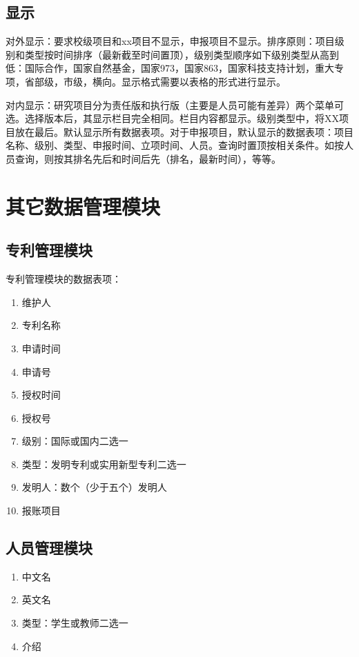 \subsection{显示}

对外显示：要求校级项目和xx项目不显示，申报项目不显示。排序原则：项目级别和类型按时间排序（最新截至时间置顶），级别类型顺序如下级别类型从高到低：国际合作，国家自然基金，国家973，国家863，国家科技支持计划，重大专项，省部级，市级，横向。显示格式需要以表格的形式进行显示。

对内显示：研究项目分为责任版和执行版（主要是人员可能有差异）两个菜单可选。选择版本后，其显示栏目完全相同。栏目内容都显示。级别类型中，将XX项目放在最后。默认显示所有数据表项。对于申报项目，默认显示的数据表项：项目名称、级别、类型、申报时间、立项时间、人员。查询时置顶按相关条件。如按人员查询，则按其排名先后和时间后先（排名，最新时间），等等。

\section{其它数据管理模块}\subsection{专利管理模块}

专利管理模块的数据表项：

\begin{enumerate}
\item 维护人
\item 专利名称
\item 申请时间
\item 申请号
\item 授权时间
\item 授权号
\item 级别：国际或国内二选一
\item 类型：发明专利或实用新型专利二选一
\item 发明人：数个（少于五个）发明人
\item 报账项目
\end{enumerate}

\subsection{人员管理模块}

\begin{enumerate}
\item 中文名
\item 英文名
\item 类型：学生或教师二选一
\item 介绍
\end{enumerate}

